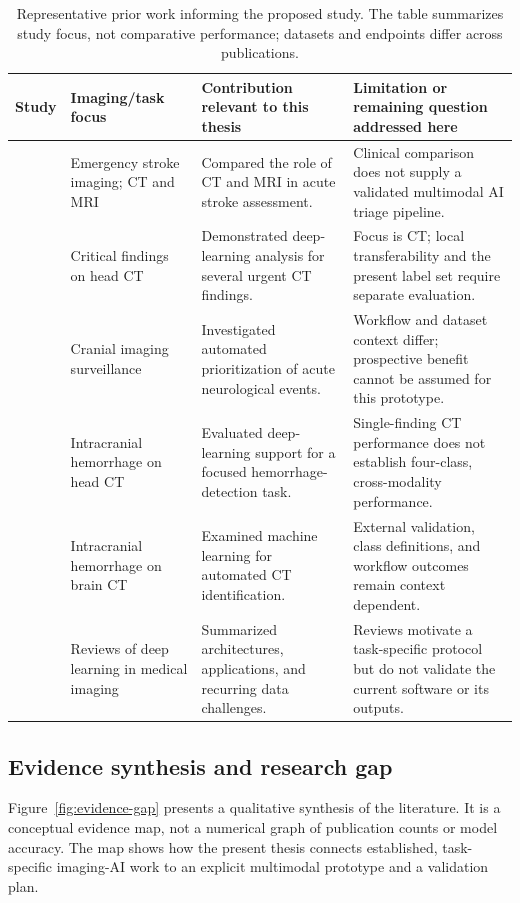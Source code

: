 \documentclass[10pt,a4paper]{article}
\begin{document}
\begin{table}[t]
\centering
\small
\caption{Representative prior work informing the proposed study. The table summarizes study focus, not comparative performance; datasets and endpoints differ across publications.}
\label{tab:prior-work}
\begin{tabular}{p{}p{}p{}p{}}
\toprule
Study & Imaging/task focus & Contribution relevant to this thesis & Limitation or remaining question addressed here \\
\midrule
\citep{chalela2007} & Emergency stroke imaging; CT and MRI & Compared the role of CT and MRI in acute stroke assessment. & Clinical comparison does not supply a validated multimodal AI triage pipeline. \\
\citep{chilamkurthy2018} & Critical findings on head CT & Demonstrated deep-learning analysis for several urgent CT findings. & Focus is CT; local transferability and the present label set require separate evaluation. \\
\citep{titano2018} & Cranial imaging surveillance & Investigated automated prioritization of acute neurological events. & Workflow and dataset context differ; prospective benefit cannot be assumed for this prototype. \\
\citep{kuo2019} & Intracranial hemorrhage on head CT & Evaluated deep-learning support for a focused hemorrhage-detection task. & Single-finding CT performance does not establish four-class, cross-modality performance. \\
\citep{arbabshirani2018} & Intracranial hemorrhage on brain CT & Examined machine learning for automated CT identification. & External validation, class definitions, and workflow outcomes remain context dependent. \\
\citep{litjens2017,shen2017} & Reviews of deep learning in medical imaging & Summarized architectures, applications, and recurring data challenges. & Reviews motivate a task-specific protocol but do not validate the current software or its outputs. \\
\bottomrule
\end{tabular}
\end{table}
\FloatBarrier

\subsection{Evidence synthesis and research gap}
Figure~\ref{fig:evidence-gap} presents a qualitative synthesis of the literature. It is a conceptual evidence map, not a numerical graph of publication counts or model accuracy. The map shows how the present thesis connects established, task-specific imaging-AI work to an explicit multimodal prototype and a validation plan.
\end{document}
